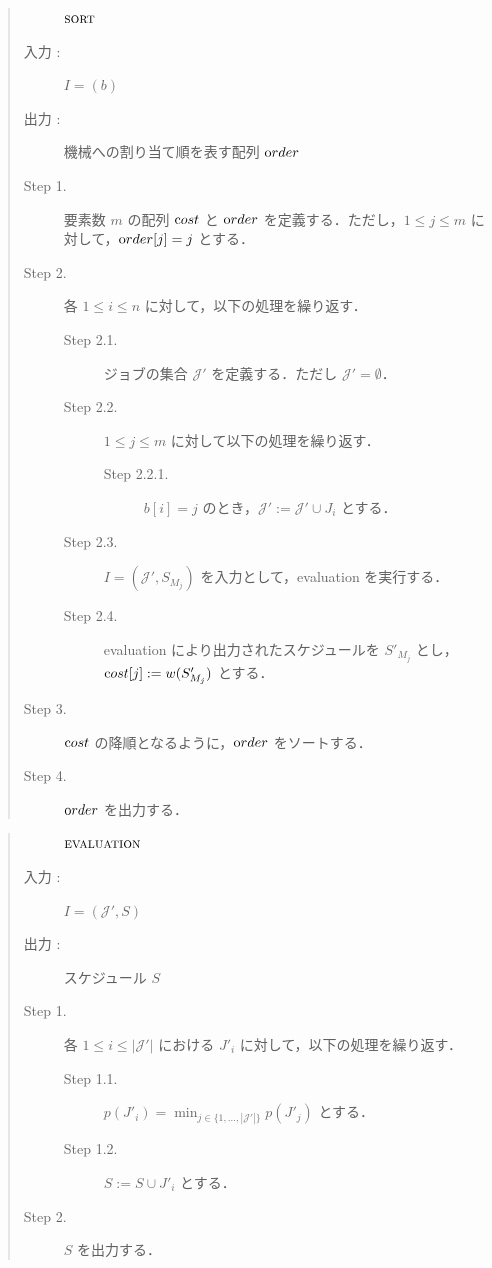 \documentclass[12pt]{optlab-bachelor}
\begin{document}
\begin{quote}
  \begin{description}
    \item[] ${\mbox {\bf {\sc sort}}}$
    \item[入力 :] $I = (b)$
    \item[出力 :] 機械への割り当て順を表す配列 ${\mbox order}$
  \end{description}
  \begin{description}
    \item[Step 1.] 要素数 $m$ の配列 ${\mbox cost}$ と ${\mbox order}$ を定義する．ただし，$1 \le j \le m $ に対して，${\mbox order}[j] = j$ とする．
    \item[Step 2.] 各 $1 \le i \le n$ に対して，以下の処理を繰り返す．
    \begin{description}
      \item[Step 2.1.] ジョブの集合 $\mathcal{J}'$ を定義する．ただし $\mathcal{J}' = \emptyset$．
      \item[Step 2.2.] $1 \le j \le m$ に対して以下の処理を繰り返す．
      \begin{description}
        \item[Step 2.2.1.] $b[i] = j$ のとき，$\mathcal{J}' :=\mathcal{J}' \cup J_i$ とする．
      \end{description}
      \item[Step 2.3.] $I = (\mathcal{J}',S_{M_j})$ を入力として，{\sc evaluation} を実行する．
      \item[Step 2.4.] {\sc evaluation} により出力されたスケジュールを $S'_{M_j}$ とし，\\${\mbox cost}[j] := w(S'_{M_j})$ とする．
    \end{description}
    \item[Step 3.] ${\mbox cost}$ の降順となるように，${\mbox order}$ をソートする．
    \item[Step 4.] ${\mbox order}$ を出力する．
  \end{description}
\end{quote}

\begin{quote}
  \begin{description}
    \item[] ${\mbox {\bf {\sc evaluation}}}$
    \item[入力 :] $I = (\mathcal{J'},S)$
    \item[出力 :] スケジュール $S$
  \end{description}
  \begin{description}
    \item[Step 1.] 各 $1 \le i \le |\mathcal{J}'|$ における $J'_i$ に対して，以下の処理を繰り返す．
    \begin{description}
      \item[Step 1.1.] $p(J'_i) = \displaystyle \min_{j \in \{1,\ldots,|\mathcal{J}'|\}}p(J'_j)$ とする．
      \item[Step 1.2.] $S := S \cup J'_i$ とする．
    \end{description}
    \item[Step 2.] $S$ を出力する．
  \end{description}
\end{quote}
\end{document}
